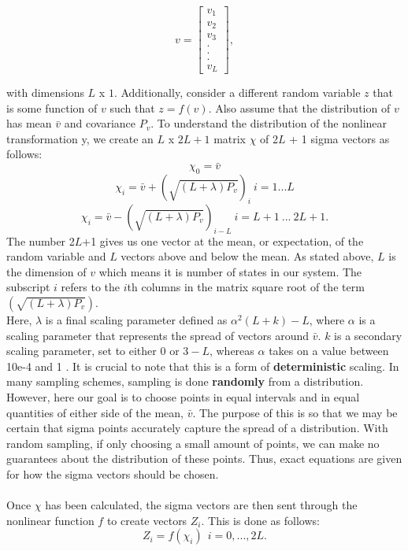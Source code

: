     \begin{equation}
    v = \begin{bmatrix} v_1\\ v_2\\v_3\\.\\.\\.\\v_L\end{bmatrix},
    \end{equation}
    
    with dimensions $L$ x $1$. Additionally, consider a different random variable $z$ that is some function of $v$ such that $z = f(v)$. Also assume that the distribution of $v$ has mean $\bar{v}$ and covariance $P_v$. To understand the distribution of the nonlinear transformation y, we create an $L$ x $2L+1$ matrix $\chi$ of 2$L$ + 1 sigma vectors as follows:
    \begin{equation} \label{eq:UT_1}
    \chi_0 = \bar{v}
    \end{equation}
    \begin{equation} \label{eq:UT_2}
    \chi_i = \bar{v} + (\sqrt{(L + \lambda)P_v})_i \ i = 1 ... L
    \end{equation}
    \begin{equation} \label{eq:UT_3}
    \chi_i = \bar{v} - (\sqrt{(L + \lambda)P_v})_{i - L} \ i = L + 1 \  ...  \ 2L + 1.
    \end{equation}
    The number 2$L$+1 gives us one vector at the mean, or expectation, of the random variable and $L$ vectors above and below the mean. As stated above, $L$ is the dimension of $v$ which means it is number of states in our system. The subscript $i$ refers to the $i$th columns in the matrix square root of the term $(\sqrt{(L + \lambda)P_v})$.\\

    Here, $\lambda$ is a final scaling parameter defined as $\alpha^2(L + k) - L$, where $\alpha$ is a scaling parameter that represents the spread of vectors around $\bar{v}$. $k$ is a secondary scaling parameter, set to either 0 or $3-L$, whereas $\alpha$ takes on a value between 10e-4 and 1 \cite{VanMereChapter}. It is crucial to note that this is a form of \textbf{deterministic} scaling. In many sampling schemes, sampling is done \textbf{randomly} from a distribution. However, here our goal is to choose points in equal intervals and in equal quantities of either side of the mean, $\bar{v}$. The purpose of this is so that we may be certain that sigma points accurately capture the spread of a distribution. With random sampling, if only choosing a small amount of points, we can make no guarantees about the distribution of these points. Thus, exact equations are given for how the sigma vectors should be chosen. \\
    \\
    Once $\chi$ has been calculated, the sigma vectors are then sent through the nonlinear function $f$ to create vectors $Z_i$. This is done as follows:
    \begin{equation}
    Z_i = f(\chi_i) \ \ i = 0,...,2L.
    \end{equation}
    
